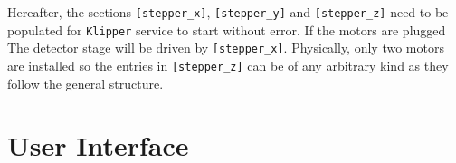         Hereafter, the sections \texttt{[stepper\_x]}, \texttt{[stepper\_y]} and \texttt{[stepper\_z]} need to be populated for \texttt{Klipper} service to start without error.
        If the motors are plugged
        The detector stage will be driven by \texttt{[stepper\_x]}.
        Physically, only two motors are installed so the entries in \texttt{[stepper\_z]} can be of any arbitrary kind as they follow the general structure.
            

    \section{User Interface}
        \lipsum